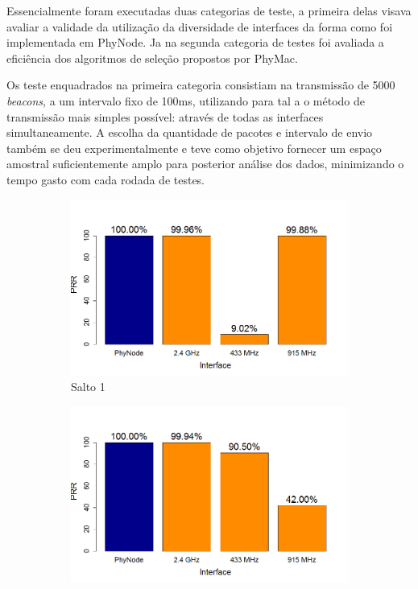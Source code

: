 \documentclass[
	12pt,				%
	openright,			%
	oneside,
	a4paper,			%
	english,			%
	french,				%
	spanish,			%
	brazil				%
	]{abntex2}
\begin{document}
Essencialmente foram executadas duas categorias de teste, a primeira delas visava avaliar a validade da utilização da diversidade de interfaces da forma como foi implementada em PhyNode. Ja na segunda categoria de testes foi avaliada a eficiência dos algoritmos de seleção propostos por PhyMac.

Os teste enquadrados na primeira categoria consistiam na transmissão de 5000 \textit{beacons}, a um intervalo fixo de 100ms, utilizando para tal a o método de transmissão mais simples possível: através de todas as interfaces simultaneamente. A escolha da quantidade de pacotes e intervalo de envio também se deu experimentalmente e teve como objetivo fornecer um espaço amostral suficientemente amplo para posterior análise dos dados, minimizando o tempo gasto com cada rodada de testes.

\begin{figure}[tb]
	\centering
	\caption{PRR (Transmissão através de todas as interfaces)}
	\label{fig_prr_no_opt}
	\begin{subfigure}{.5\textwidth}
		\centering
		\includegraphics[width=.98\linewidth]{PRR_Salto1}
		\captionsetup{width=.9\textwidth}
		\caption{Salto 1}
		\label{prr_no_opt_s1}
	\end{subfigure}%
	\begin{subfigure}{.5\textwidth}
		\centering
		\includegraphics[width=.98\linewidth]{PRR_Salto2}

\end{subfigure}
\end{figure}
\end{document}

